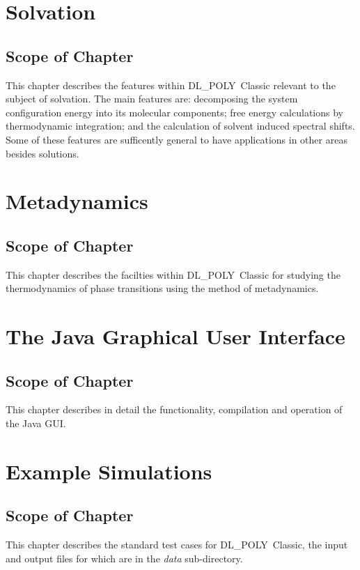 \documentclass[11pt,a4paper,dvipdfm]{report}
\newcommand{\D}{\mbox{DL\_POLY Classic}}
\begin{document}
\chapter{Solvation}
\label{solvation}
\setcounter{equation}{0}
\newpage
\section*{Scope of Chapter}
This chapter describes the features within \D{} relevant to the subject of
solvation.  The main features are: decomposing the system configuration energy
into its molecular components; free energy calculations by thermodynamic
integration; and the calculation of solvent induced spectral shifts.  Some of
these features are sufficently general to have applications in other areas
besides solutions.  \newpage  \newpage

\chapter{Metadynamics}
\label{metadynamics}
\setcounter{equation}{0}
\newpage
\section*{Scope of Chapter}
This chapter describes the facilties within \D{} for studying the 
thermodynamics of phase transitions using the method of metadynamics.
\newpage

\newpage

\chapter{The Java Graphical User Interface}
\label{java}
\setcounter{equation}{0}
\newpage
\section*{Scope of Chapter}
This chapter describes in detail the functionality,
compilation and operation of the Java GUI.
\newpage  \newpage

\chapter{Example Simulations}
\label{data}
\setcounter{equation}{0}
\newpage
\section*{Scope of Chapter}
This chapter describes the standard test cases for \D{}, the input
and output files for which are in the {\em data} sub-directory.
\newpage

\end{document}
